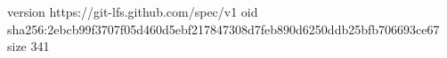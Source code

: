 version https://git-lfs.github.com/spec/v1
oid sha256:2ebcb99f3707f05d460d5ebf217847308d7feb890d6250ddb25bfb706693ce67
size 341
